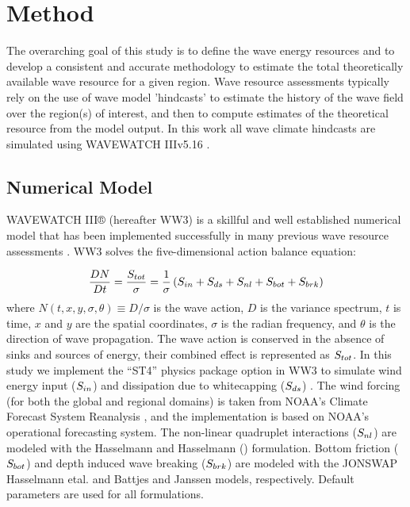 \section{Method} \label{sec:method}
The overarching goal of this study is to define the wave energy resources and to develop a consistent and accurate methodology to estimate the total theoretically available wave resource for a given region. 
Wave resource assessments typically rely on the use of wave model 'hindcasts' to estimate the history of the wave field over the region(s) of interest, and then to compute estimates of the theoretical resource from the model output. 
In this work all wave climate hindcasts are simulated using WAVEWATCH III\textregistered v5.16 \citep{tolmanDistributedmemoryConceptsWave2002}.

\subsection{Numerical Model} \label{sec:method:model}
WAVEWATCH III® (hereafter WW3) is a skillful and well established numerical model that has been implemented successfully in many previous wave resource assessments \citep[e.g.,][]{garcia-medinaWaveResourceAssessment2014,yangWaveModelTest2017}.
WW3 solves the five-dimensional action balance equation:

\begin{align}
  \frac{DN}{Dt} = \frac{S_{ tot }}{\sigma} = \frac{1}{\sigma}\left ( S_{ in } + S_{ ds } + S_{ nl } + S_{ bot } + S_{ brk } \right )
\end{align}
where $N(t,x,y,\sigma,\theta) \equiv D/\sigma$ is the wave action, $D$ is the variance spectrum, $t$ is time, $x$ and $y$ are the spatial coordinates, $\sigma$ is the radian frequency, and $\theta$ is the direction of wave propagation.
The wave action is conserved in the absence of sinks and sources of energy, their combined effect is represented as $S_{ tot }$. In this study we implement the ``ST4'' physics package option in WW3 to simulate wind energy input ($S_{ in }$) and dissipation due to whitecapping ($S_{ ds }$) \citep{ardhuinObservationSwellDissipation2009}.
The wind forcing (for both the global and regional domains) is taken from NOAA's Climate Forecast System Reanalysis \citep{sahaNCEPClimateForecast2010}, and the implementation is based on NOAA's operational forecasting system.
The non-linear quadruplet interactions ($S_{ nl }$) are modeled with the Hasselmann and Hasselmann (\citeyear{hasselmannComputationsParameterizationsNonlinear1985}) formulation.
Bottom friction ($S_{ bot }$) and depth induced wave breaking ($S_{ brk }$) are modeled with the JONSWAP Hasselmann etal. \citeyear{hasselmannMeasurementsWindwaveGrowth1973} and Battjes and Janssen \citeyear{battjesEnergyLossSetup1978} models, respectively.
Default parameters are used for all formulations. 


